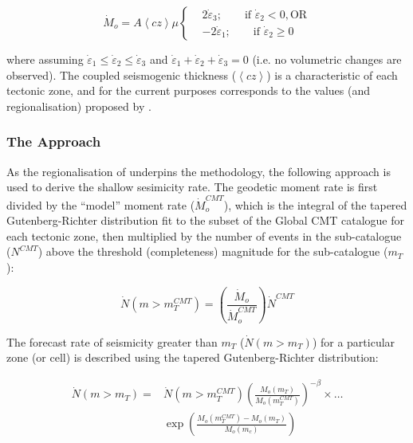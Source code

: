  \begin{equation}
 \dot{M}_o = A \left\langle {cz} \right\rangle \mu \left\{ \begin{split}
    &2 \dot{\varepsilon}_3; \qquad \text{if } \dot{\varepsilon}_2 < 0, \text{OR} \\
    &-2 \dot{\varepsilon}_1; \qquad \text{if } \dot{\varepsilon}_2 \geq 0
 \end{split}
 \end{equation}
 
 where assuming $\dot{\varepsilon}_1 \leq \dot{\varepsilon}_2 \leq \dot{\varepsilon}_3$ and $\dot{\varepsilon}_1 + \dot{\varepsilon}_2 + \dot{\varepsilon}_3 = 0$ (i.e. no volumetric changes are observed). The coupled seismogenic thickness ($\left\langle cz \right\rangle$) is a characteristic of each tectonic zone, and for the current purposes corresponds to the values (and regionalisation) proposed by \cite{BirdKagan2004}. 
 
 \subsubsection{The \cite{BirdLiu2007} Approach}
 
 As the regionalisation of \citet{BirdKagan2004} underpins the \cite{BirdLiu2007} methodology, the following approach is used to derive the shallow sesimicity rate. The geodetic moment rate  is first divided by the ``model'' moment rate ($\dot{M}_o^{CMT}$), which is the integral of the tapered Gutenberg-Richter distribution fit to the subset of the Global CMT catalogue for each tectonic zone, then multiplied by the number of events in the sub-catalogue ($N^{CMT}$) above the threshold (completeness) magnitude for the sub-catalogue ($m_T$):
 
 \begin{equation}
 \dot{N} \left( {m > m_T^{CMT}} \right) = \left( {\frac{\dot{M}_o}{\dot{M}_o^{CMT}}} \right) \dot{N}^{CMT}
 \end{equation}

The forecast rate of seismicity greater than $m_T$ ($\dot{N} \left( {m > m_T} \right)$) for a particular zone (or cell) is described using the tapered Gutenberg-Richter distribution:

\begin{equation}
\begin{split}
\dot{N} \left( {m > m_T} \right) =& \dot{N} \left( {m > m_T^{CMT}} \right) \left( {\frac{M_o \left( {m_T} \right)}{M_o \left( {m_T^{CMT}} \right)}} \right)^{-\beta} \times \ldots \\
& \exp \left( {\frac{M_o \left( {m_T^{CMT}} \right) - M_o \left( {m_T} \right)}{M_o \left( {m_c} \right)}} \right)\end{split}
\end{equation}
 
